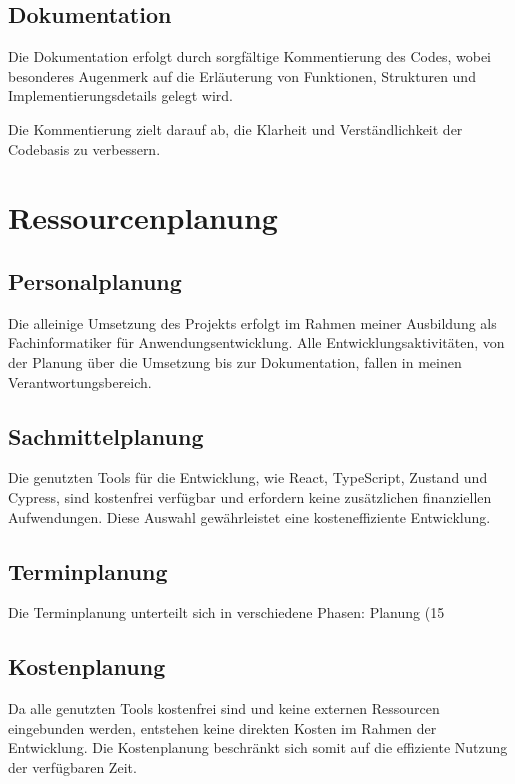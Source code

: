 \documentclass[hidelinks,12pt]{article}
\begin{document}
\subsection{Dokumentation}
Die Dokumentation erfolgt durch sorgfältige Kommentierung des Codes, wobei besonderes Augenmerk auf die Erläuterung von Funktionen, Strukturen und Implementierungsdetails gelegt wird.

Die Kommentierung zielt darauf ab, die Klarheit und Verständlichkeit der Codebasis zu verbessern.

\section{Ressourcenplanung}

\subsection{Personalplanung}
Die alleinige Umsetzung des Projekts erfolgt im Rahmen meiner Ausbildung als Fachinformatiker für Anwendungsentwicklung. Alle Entwicklungsaktivitäten, von der Planung über die Umsetzung bis zur Dokumentation, fallen in meinen Verantwortungsbereich.

\subsection{Sachmittelplanung}
Die genutzten Tools für die Entwicklung, wie React, TypeScript, Zustand und Cypress, sind kostenfrei verfügbar und erfordern keine zusätzlichen finanziellen Aufwendungen. Diese Auswahl gewährleistet eine kosteneffiziente Entwicklung.

\subsection{Terminplanung}
Die Terminplanung unterteilt sich in verschiedene Phasen: Planung (15%

\subsection{Kostenplanung}
Da alle genutzten Tools kostenfrei sind und keine externen Ressourcen eingebunden werden, entstehen keine direkten Kosten im Rahmen der Entwicklung. Die Kostenplanung beschränkt sich somit auf die effiziente Nutzung der verfügbaren Zeit.
\end{document}
